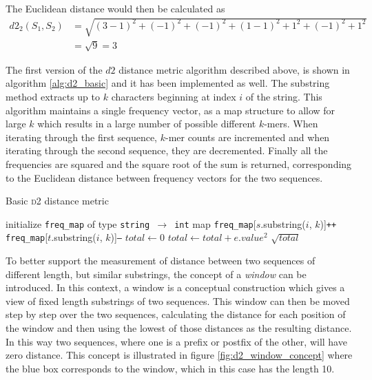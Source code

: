 The Euclidean distance would then be calculated as
\begin{align*}
  d2_2(S_1, S_2)
    &= \sqrt{(3-1)^2 + (-1)^2 + (-1)^2 + (1-1)^2 + 1^2 + (-1)^2 + 1^2} \\
    &= \sqrt{9} = 3
\end{align*}

The first version of the $d2$ distance metric algorithm described above, is
shown in algorithm \ref{alg:d2_basic} and it has been implemented as well. The
substring method extracts up to $k$ characters beginning at index $i$ of the
string. This algorithm maintains a single frequency vector, as a map structure
to allow for large $k$ which results in a large number of possible different
$k$-mers. When iterating through the first sequence, $k$-mer counts are
incremented and when iterating through the second sequence, they are
decremented. Finally all the frequencies are squared and the square root of the
sum is returned, corresponding to the Euclidean distance between frequency
vectors for the two sequences.

\begin{algorithm}
  \caption{Basic \textsc{d2} distance metric}
  \label{alg:d2_basic}
  \begin{algorithmic}[1]
    \Statex
      \State initialize \texttt{freq\_map} of type \texttt{string $\to$ int} map
        \State \texttt{freq\_map}[$s$.substring($i$, $k$)]\texttt{++}
      \EndFor
        \State \texttt{freq\_map}[$t$.substring($i$, $k$)]\texttt{--}
      \EndFor
      \State $total \gets 0$
        \State $total \gets total + e.value^2$
      \EndFor
      \State \Return $\sqrt{total}$
    \EndFunction
  \end{algorithmic}
\end{algorithm}

To better support the measurement of distance between two sequences of
different length, but similar substrings, the concept of a \emph{window} can be
introduced. In this context, a window is a conceptual construction which gives
a view of fixed length substrings of two sequences. This window can then be
moved step by step over the two sequences, calculating the distance for each
position of the window and then using the lowest of those distances as the
resulting distance. In this way two sequences, where one is a prefix or postfix
of the other, will have zero distance. This concept is illustrated in figure
\ref{fig:d2_window_concept} where the blue box corresponds to the window, which
in this case has the length 10.

